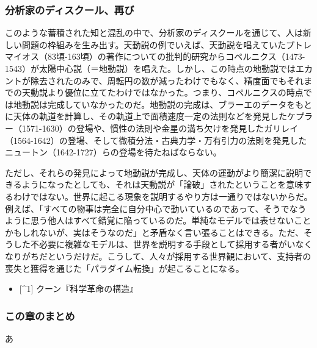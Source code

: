 \subsubsection{分析家のディスクール、再び}\label{ux5206ux6790ux5bb6ux306eux30c7ux30a3ux30b9ux30afux30fcux30ebux518dux3073}

このような蓄積された知と混乱の中で、分析家のディスクールを通じて、人は新しい問題の枠組みを生み出す。天動説の例でいえば、天動説を唱えていたプトレマイオス（83頃-163頃）の著作についての批判的研究からコペルニクス（1473-1543）が太陽中心説（＝地動説）を唱えた。しかし、この時点の地動説ではエカントが除去されたのみで、周転円の数が減ったわけでもなく、精度面でもそれまでの天動説より優位に立てたわけではなかった。つまり、コペルニクスの時点では地動説は完成していなかったのだ。地動説の完成は、ブラーエのデータをもとに天体の軌道を計算し、その軌道上で面積速度一定の法則などを発見したケプラー（1571-1630）の登場や、慣性の法則や金星の満ち欠けを発見したガリレイ（1564-1642）の登場、そして微積分法・古典力学・万有引力の法則を発見したニュートン（1642-1727）らの登場を待たねばならない。

ただし、それらの発見によって地動説が完成し、天体の運動がより簡潔に説明できるようになったとしても、それは天動説が「論破」されたということを意味するわけではない。世界に起こる現象を説明するやり方は一通りではないからだ。例えば、「すべての物事は完全に自分中心で動いているのであって、そうでなうように思う他人はすべて錯覚に陥っているのだ。単純なモデルでは表せないことかもしれないが、実はそうなのだ」と矛盾なく言い張ることはできる。ただ、そうした不必要に複雑なモデルは、世界を説明する手段として採用する者がいなくなりがちだというだけだ。こうして、人々が採用する世界観において、支持者の喪失と獲得を通じた「パラダイム転換」が起こることになる。

\begin{itemize}
\tightlist
\item
  {[}\^{}1{]} クーン『科学革命の構造』
\end{itemize}

\subsubsection{この章のまとめ}\label{ux3053ux306eux7ae0ux306eux307eux3068ux3081}

あ

